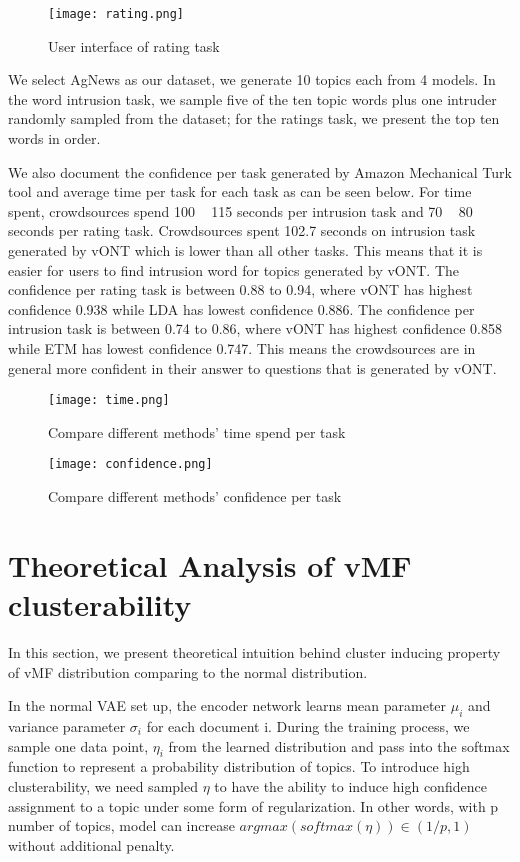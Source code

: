 \documentclass[11pt]{article}
\begin{document}
\begin{figure*}
\centering
\texttt{[image: rating.png]}
\caption{User interface of rating task }
\label{rating}
\end{figure*}

We select AgNews as our dataset, we generate 10 topics each from 4 models. In the word intrusion task, we sample five of the ten topic words plus one intruder randomly sampled from the dataset; for the ratings task, we present the top ten words in order. 


We also document the confidence per task generated by Amazon Mechanical Turk tool and average time per task for each task as can be seen below. For time spent, crowdsources spend 100 ~ 115 seconds per intrusion task and 70 ~ 80 seconds per rating task. Crowdsources spent 102.7 seconds on intrusion task generated by vONT which is lower than all other tasks. This means that it is easier for users to find intrusion word for topics generated by vONT. The confidence per rating task is between 0.88 to 0.94, where vONT has highest confidence 0.938 while LDA has lowest confidence 0.886. The confidence per intrusion task is between 0.74 to 0.86, where vONT has highest confidence 0.858 while ETM has lowest confidence 0.747. This means the crowdsources are in general more confident in their answer to questions that is generated by vONT.

\begin{figure*}
\centering
\texttt{[image: time.png]}
\caption{Compare different methods' time spend per task }
\label{time}
\end{figure*}

\begin{figure*}
\centering
\texttt{[image: confidence.png]}
\caption{Compare different methods'  confidence per task}
\label{confidence}
\end{figure*}






\section{Theoretical Analysis of vMF clusterability}
\label{theory}
In this section, we present theoretical intuition behind cluster inducing property of vMF distribution comparing to the normal distribution.

In the normal VAE set up, the encoder network learns mean parameter $\mu_{i}$ and variance parameter $\sigma_{i}$ for each document i. During the training process, we sample one data point, $\eta_{i}$ from the learned distribution and pass into the softmax function to represent a probability distribution of topics. To introduce high clusterability, we need sampled $\eta$ to have the ability to induce high confidence assignment to a topic under some form of regularization. In other words, with p number of topics, model can increase $argmax(softmax(\eta)) \in (1/p, 1)$ without additional penalty. 
\end{document}
